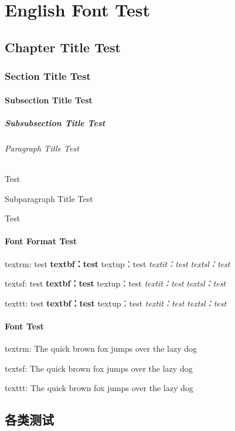 \documentclass{resources/DocClass}
\begin{document}
    \part{English Font Test}
    \chapter{Chapter Title Test}
    \section{Section Title Test}
    \subsection{Subsection Title Test}
    \subsubsection{Subsubsection Title Test}
    \paragraph{Paragraph Title Test}
    Test
    \subparagraph{Subparagraph Title Test}
    Test

    \subsection{Font Format Test}
    {\rmfamily textrm: test \textbf{textbf：test} \textup{textup：test} \textit{textit：test} \textsl{textsl：test}}

    {\sffamily textsf: test \textbf{textbf：test} \textup{textup：test} \textit{textit：test} \textsl{textsl：test}}

    {\ttfamily texttt: test \textbf{textbf：test} \textup{textup：test} \textit{textit：test} \textsl{textsl：test}}

    \subsection{Font Test}
    {\rmfamily textrm: The quick brown fox jumps over the lazy dog}

    {\sffamily textsf: The quick brown fox jumps over the lazy dog}

    {\ttfamily texttt: The quick brown fox jumps over the lazy dog}

    \chapter{各类测试}
\end{document}
